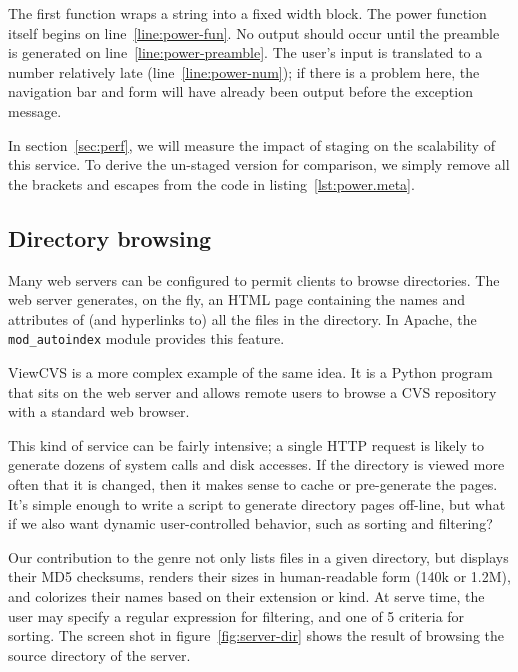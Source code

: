 \documentclass[preprint]{acm_proc_article-sp}
\newcommand{\mylst}[3]{%
  }
\newcommand{\lstfile}{\mylst{}}
\begin{document}
\lstfile{power.meta}{This implements the staged power function as a
  web service.  The exponent \cd{y} is an early (publish stage)
  argument; but the base \cd{x} is late (serve stage).}

The first function wraps a string into a fixed width block.  The power
function itself begins on line~\ref{line:power-fun}.  No output should
occur until the preamble is generated on
line~\ref{line:power-preamble}.  The user's input is translated to a
number relatively late (line~\ref{line:power-num}); if there is a
problem here, the navigation bar and form will have already been
output before the exception message.

In section~\ref{sec:perf}, we will measure the impact of staging on
the scalability of this service.  To derive the un-staged version for
comparison, we simply remove all the brackets and escapes from the
code in listing~\ref{lst:power.meta}.

\subsection{Directory browsing}
\label{sec:eg:browse}

Many web servers can be configured to permit clients to browse
directories.  The web server generates, on the fly, an HTML page
containing the names and attributes of (and hyperlinks to) all
the files in the directory.  In Apache, the
\texttt{mod\_autoindex} module provides this feature.

ViewCVS is a more complex example of the same idea.  It is a
Python program that sits on the web server and allows remote
users to browse a CVS repository with a standard web browser.

This kind of service can be fairly intensive; a single HTTP
request is likely to generate dozens of system calls and disk
accesses.  If the directory is viewed more often that it is
changed, then it makes sense to cache or pre-generate the pages.
It's simple enough to write a script to generate directory pages
off-line, but what if we also want dynamic user-controlled
behavior, such as sorting and filtering?

Our contribution to the genre not only lists files in a given
directory, but displays their MD5 checksums, renders their sizes
in human-readable form (140k or 1.2M), and colorizes their names
based on their extension or kind.  At serve time, the user may
specify a regular expression for filtering, and one of 5
criteria for sorting.  The screen shot in
figure~\ref{fig:server-dir} shows the result of browsing the
source directory of the server.
\end{document}
